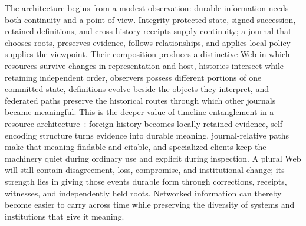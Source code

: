 The architecture begins from a modest observation: durable information needs both continuity and a point of view. Integrity-protected state, signed succession, retained definitions, and cross-history receipts supply continuity; a journal that chooses roots, preserves evidence, follows relationships, and applies local policy supplies the viewpoint. Their composition produces a distinctive Web in which resources survive changes in representation and host, histories intersect while retaining independent order, observers possess different portions of one committed state, definitions evolve beside the objects they interpret, and federated paths preserve the historical routes through which other journals became meaningful. This is the deeper value of timeline entanglement in a resource architecture~\cite{Maniatis2002timeline}: foreign history becomes locally retained evidence, self-encoding structure turns evidence into durable meaning, journal-relative paths make that meaning findable and citable, and specialized clients keep the machinery quiet during ordinary use and explicit during inspection. A plural Web will still contain disagreement, loss, compromise, and institutional change; its strength lies in giving those events durable form through corrections, receipts, witnesses, and independently held roots. Networked information can thereby become easier to carry across time while preserving the diversity of systems and institutions that give it meaning.